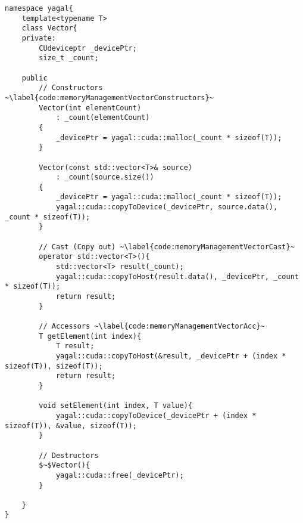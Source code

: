 

\begin{lstlisting}[caption={Vector class, showing only code relevant to memory management.}, label={code:memoryManagementVector}, mathescape]
namespace yagal{
    template<typename T>
    class Vector{
    private:
        CUdeviceptr _devicePtr;
        size_t _count;

    public
        // Constructors ~\label{code:memoryManagementVectorConstructors}~
        Vector(int elementCount)
            : _count(elementCount)
        {
            _devicePtr = yagal::cuda::malloc(_count * sizeof(T));
        }

        Vector(const std::vector<T>& source)
            : _count(source.size())
        {
            _devicePtr = yagal::cuda::malloc(_count * sizeof(T));
            yagal::cuda::copyToDevice(_devicePtr, source.data(), _count * sizeof(T));
        }

        // Cast (Copy out) ~\label{code:memoryManagementVectorCast}~
        operator std::vector<T>(){
            std::vector<T> result(_count);
            yagal::cuda::copyToHost(result.data(), _devicePtr, _count * sizeof(T));
            return result;
        }

        // Accessors ~\label{code:memoryManagementVectorAcc}~
        T getElement(int index){
            T result;
            yagal::cuda::copyToHost(&result, _devicePtr + (index * sizeof(T)), sizeof(T));
            return result;
        }

        void setElement(int index, T value){
            yagal::cuda::copyToDevice(_devicePtr + (index * sizeof(T)), &value, sizeof(T));
        }

        // Destructors
        $~$Vector(){
            yagal::cuda::free(_devicePtr);
        }

    }
}
\end{lstlisting}
